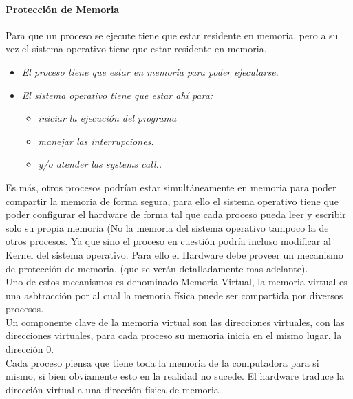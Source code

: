 \documentclass[../main.tex]{subfiles}
\begin{document}
            \paragraph*{Protección de Memoria}
                Para que un proceso se ejecute tiene que estar residente en memoria, pero a su vez el sistema operativo tiene que estar residente en memoria.
                \begin{itemize}
                    \item \textit{El proceso tiene que estar en memoria para poder ejecutarse.}
                    \item \textit{El sistema operativo tiene que estar ahí para:}
                        \begin{itemize}
                            \item \textit{iniciar la ejecución del programa}
                            \item \textit{manejar las interrupciones.}
                            \item \textit{y/o atender las systems call..}
                        \end{itemize}
                \end{itemize}
                
                Es más, otros procesos podrían estar simultáneamente en memoria para poder compartir la memoria de forma segura, para ello el sistema operativo tiene que poder configurar el hardware de forma tal que cada proceso pueda leer y escribir solo su propia memoria (No la memoria del sistema operativo tampoco la de otros procesos. Ya que sino el proceso en cuestión podría incluso modificar al Kernel del sistema operativo. Para ello el Hardware debe proveer un mecanismo de protección de memoria, (que se verán detalladamente mas adelante).\\

                Uno de estos mecanismos es denominado Memoria Virtual, la memoria virtual es una asbtracción por al cual la memoria física puede ser compartida por diversos procesos.\\

                Un componente clave de la memoria virtual son las direcciones virtuales, con las direcciones virtuales, para cada proceso su memoria inicia en el mismo lugar, la dirección 0.\\

                Cada proceso piensa que tiene toda la memoria de la computadora para si mismo, si bien obviamente esto en la realidad no sucede. El hardware traduce la dirección virtual a una dirección física de memoria.
\end{document}
